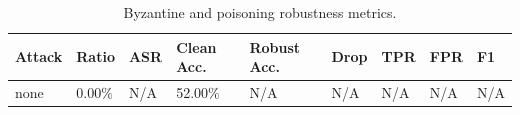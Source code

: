 \begin{table}[t]
\centering
\caption{Byzantine and poisoning robustness metrics.}
\label{tab:attack_robustness}
\begin{tabular}{lllllllll}
\hline
Attack & Ratio & ASR & Clean Acc. & Robust Acc. & Drop & TPR & FPR & F1 \\
\hline
none & 0.00\% & N/A & 52.00\% & N/A & N/A & N/A & N/A & N/A \\
\hline
\end{tabular}
\end{table}
